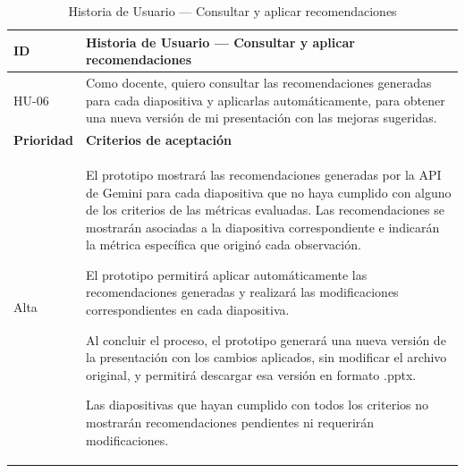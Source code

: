 \documentclass[11pt]{article}
\begin{document}
\begin{table}[H]
    \centering
    \renewcommand{\arraystretch}{1.2}
    \begin{tabular}{|p{2.5cm}|p{11cm}|}
        \hline
        \textbf{ID} & \textbf{Historia de Usuario --- Consultar y aplicar recomendaciones} \\
        \hline
        HU-06 & Como docente, quiero consultar las recomendaciones generadas para cada diapositiva y aplicarlas automáticamente, para obtener una nueva versión de mi presentación con las mejoras sugeridas. \\
        \hline
        \textbf{Prioridad} & \textbf{Criterios de aceptación} \\
        \hline
        Alta & El prototipo mostrará las recomendaciones generadas por la API de Gemini para cada diapositiva que no haya cumplido con alguno de los criterios de las métricas evaluadas. Las recomendaciones se mostrarán asociadas a la diapositiva correspondiente e indicarán la métrica específica que originó cada observación. 
        
        El prototipo permitirá aplicar automáticamente las recomendaciones generadas y realizará las modificaciones correspondientes en cada diapositiva.

        Al concluir el proceso, el prototipo generará una nueva versión de la presentación con los cambios aplicados, sin modificar el archivo original, y permitirá descargar esa versión en formato .pptx.
        
        Las diapositivas que hayan cumplido con todos los criterios no mostrarán recomendaciones pendientes ni requerirán modificaciones. \\
        \hline
    \end{tabular}
    \caption{Historia de Usuario — Consultar y aplicar recomendaciones}
    \label{tab:hu-consultar-recomendaciones}
\end{table}
\end{document}
